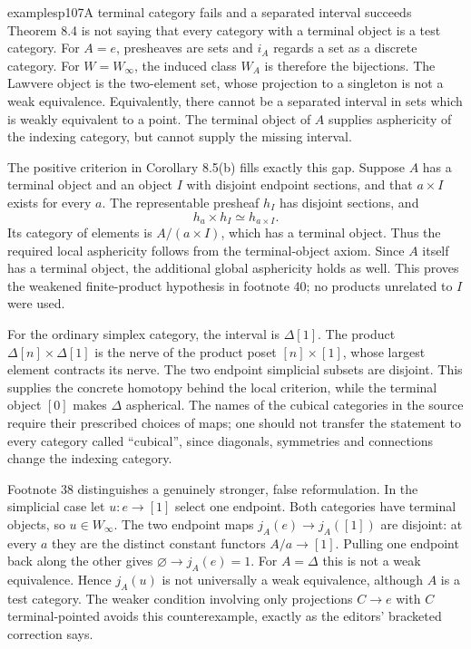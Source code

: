 \begin{dcomment}{examples}{p107}{A terminal category fails and a separated interval succeeds}
Theorem 8.4 is not saying that every category with a terminal object is a test category. For $A=e$, presheaves are sets and $i_A$ regards a set as a discrete category. For $W=W_\infty$, the induced class $W_A$ is therefore the bijections. The Lawvere object is the two-element set, whose projection to a singleton is not a weak equivalence. Equivalently, there cannot be a separated interval in sets which is weakly equivalent to a point. The terminal object of $A$ supplies asphericity of the indexing category, but cannot supply the missing interval.

The positive criterion in Corollary 8.5(b) fills exactly this gap. Suppose $A$ has a terminal object and an object $I$ with disjoint endpoint sections, and that $a\times I$ exists for every $a$. The representable presheaf $h_I$ has disjoint sections, and
\[
 h_a\times h_I\simeq h_{a\times I}.
\]
Its category of elements is $A/(a\times I)$, which has a terminal object. Thus the required local asphericity follows from the terminal-object axiom. Since $A$ itself has a terminal object, the additional global asphericity holds as well. This proves the weakened finite-product hypothesis in footnote 40; no products unrelated to $I$ were used.

For the ordinary simplex category, the interval is $\Delta[1]$. The product $\Delta[n]\times\Delta[1]$ is the nerve of the product poset $[n]\times[1]$, whose largest element contracts its nerve. The two endpoint simplicial subsets are disjoint. This supplies the concrete homotopy behind the local criterion, while the terminal object $[0]$ makes $\Delta$ aspherical. The names of the cubical categories in the source require their prescribed choices of maps; one should not transfer the statement to every category called ``cubical'', since diagonals, symmetries and connections change the indexing category.

Footnote 38 distinguishes a genuinely stronger, false reformulation. In the simplicial case let $u:e\to[1]$ select one endpoint. Both categories have terminal objects, so $u\in W_\infty$. The two endpoint maps $j_A(e)\to j_A([1])$ are disjoint: at every $a$ they are the distinct constant functors $A/a\to[1]$. Pulling one endpoint back along the other gives $\varnothing\to j_A(e)=1$. For $A=\Delta$ this is not a weak equivalence. Hence $j_A(u)$ is not universally a weak equivalence, although $A$ is a test category. The weaker condition involving only projections $C\to e$ with $C$ terminal-pointed avoids this counterexample, exactly as the editors' bracketed correction says.
\end{dcomment}

